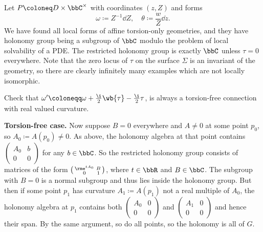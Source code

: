 Let $P\coloneq D\times\bbC^\times$ with coordinates $(z,Z)$ and forms 
\[\omega\coloneqq Z^{-1}\dd Z,\quad \theta\coloneqq \frac{w}{Z}\dd z.\]
We have found all local forms of affine torsion-only geometries, and they have holonomy group being a subgroup of $\bbC$ modulo the problem of local solvability of a PDE. The restricted holonomy group is exactly $\bbC$ unless $\tau=0$ everywhere. Note that the zero locus of $\tau$ on the surface $\varSigma$ is an invariant of the geometry, so there are clearly infinitely many examples which are not locally isomorphic.

\begin{xca}
    Check that $\omega'\coloneqq \omega+\frac{\i}{2}\wb{\tau}-\frac{\i}{2}\tau$, is always a torsion-free connection with real valued curvature.
\end{xca}


\textbf{Torsion-free case.} Now suppose $B=0$ everywhere and $A\neq 0$ at some point $p_0$, so $A_0\coloneqq A(p_0)\neq 0$. As above, the holonomy algebra at that point contains $\left(\begin{smallmatrix}
    A_0 & b\\ 0 & 0
\end{smallmatrix}\right)$ for any $b\in \bbC$. So the restricted holonomy group consists of matrices of the form $\left(\begin{smallmatrix}
    \rme^{tA_0} & B\\ 0 & 1
\end{smallmatrix}\right)$, where $t\in\bbR$ and $B\in\bbC$. The subgroup with $B=0$ is a normal subgroup and thus lies inside the holonomy group. But then if some point $p_1$ has curvature $A_1\coloneqq A(p_1)$ not a real multiple of $A_0$, the holonomy algebra at $p_1$ contains both $\left(\begin{smallmatrix}
    A_0 & 0\\ 0 & 0
\end{smallmatrix}\right)$ and $\left(\begin{smallmatrix}
    A_1 & 0\\ 0 & 0
\end{smallmatrix}\right)$ and hence their span. By the same argument, so do all points, so the holonomy is all of $G$. 

